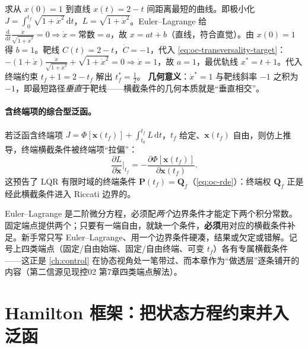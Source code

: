 \begin{example}[最短距离到一条直线靶]\label{ex:oc-intercept}
求从 $x(0)=1$ 到直线 $x(t)=2-t$ 间距离最短的曲线。即极小化 $J=\int_0^{t_f}\sqrt{1+\dot x^2}\,\mathrm dt$，$L=\sqrt{1+\dot x^2}$。Euler--Lagrange 给 $\frac{\mathrm d}{\mathrm dt}\frac{\dot x}{\sqrt{1+\dot x^2}}=0\Rightarrow\dot x=\text{常数}=a$，故 $x=at+b$（直线，符合直觉）。由 $x(0)=1$ 得 $b=1$。靶线 $C(t)=2-t$，$\dot C=-1$，代入 \cref{eq:oc-transversality-target}：$-(1+\dot x)\frac{\dot x}{\sqrt{1+\dot x^2}}+\sqrt{1+\dot x^2}=0\Rightarrow\dot x=1$，故 $a=1$，最优轨线 $x^*=t+1$。代入终端约束 $t_f+1=2-t_f$ 解出 $t_f^*=\tfrac12$。
\textbf{几何意义}：$\dot x^*=1$ 与靶线斜率 $-1$ 之积为 $-1$，即最短路径\emph{垂直}于靶线——横截条件的几何本质就是“垂直相交”。
\end{example}

\paragraph{含终端项的综合型泛函。}
若泛函含终端项 $J=\Phi[\mathbf x(t_f)]+\int_{t_0}^{t_f}L\,\mathrm dt$，$t_f$ 给定、$\mathbf x(t_f)$ 自由，则仿上推导，终端横截条件被终端项“拉偏”：
\begin{equation}
  \frac{\partial L}{\partial\dot{\mathbf x}}\Big|_{t_f}=-\frac{\partial\Phi[\mathbf x(t_f)]}{\partial\mathbf x(t_f)}.
  \label{eq:oc-transversality-phi}
\end{equation}
这预告了 LQR 有限时域的终端条件 $\mathbf P(t_f)=\mathbf Q_f$（\cref{eq:oc-rde}）：终端权 $\mathbf Q_f$ 正是经此横截条件进入 Riccati 边界的。

\begin{pitfall}
Euler--Lagrange 是二阶微分方程，必须配\emph{两个}边界条件才能定下两个积分常数。固定端点提供两个；只要有一端自由，就缺一个条件，\textbf{必须}用对应的横截条件补足。新手常只写 Euler--Lagrange、用一个边界条件硬凑，结果或欠定或错解。记号上四类端点（固定/自由始端、固定/自由终端、可变 $t_f$）各有专属横截条件——这正是 \cref{ch:control} 在协态视角处一笔带过、而本章作为“做透层”逐条铺开的内容（第二信源见现控02 第7章四类端点解法\cite{zhang2017modern}）。
\end{pitfall}

\section{Hamilton 框架：把状态方程约束并入泛函}
\label{sec:oc-hamilton}

